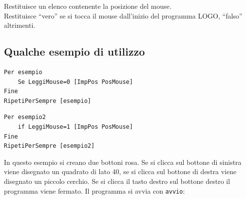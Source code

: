 Restituisce un elenco contenente la posizione del mouse.\\

Restituisce ``vero'' se si tocca il mouse dall'inizio del programma LOGO, ``falso'' altrimenti.



\subsection{Qualche esempio di utilizzo}

\begin{lstlisting}[caption="La tartaruga segue il mouse quando si sposta sullo schermo"]
Per esempio
	Se LeggiMouse=0 [ImpPos PosMouse]
Fine
RipetiPerSempre [esempio]
\end{lstlisting}

\begin{lstlisting}[caption="La tartaruga segue il mouse con il tasto premuto"]
Per esempio2
	if LeggiMouse=1 [ImpPos PosMouse]
Fine
RipetiPerSempre [esempio2]
\end{lstlisting}

In questo esempio si creano due bottoni rosa. Se si clicca sul bottone di sinistra viene disegnato un quadrato di lato 40, se si clicca sul bottone di destra viene disegnato un piccolo cerchio. Se si clicca il tasto destro sul bottone destro il programma viene fermato. Il programma si avvia con \texttt{avvio}:

